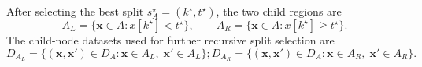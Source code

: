 \documentclass{article}
\begin{document}

After selecting the best split $s_A^\star=(k^\star,t^\star)$, the two child regions are
\[
A_L=\{\mathbf{x}\in A: x[k^\star]<t^\star\},
\qquad
A_R=\{\mathbf{x}\in A: x[k^\star]\ge t^\star\}.
\]
The child-node datasets used for further recursive split selection are
\begin{equation}\label{eq:split_left_right_revised}
D_{A_L} = \{(\mathbf{x},\mathbf{x}')\in D_A : \mathbf{x}\in A_L,\; \mathbf{x}'\in A_L\};
D_{A_R} = \{(\mathbf{x},\mathbf{x}')\in D_A : \mathbf{x}\in A_R,\; \mathbf{x}'\in A_R\}.
\end{equation}
\end{document}
